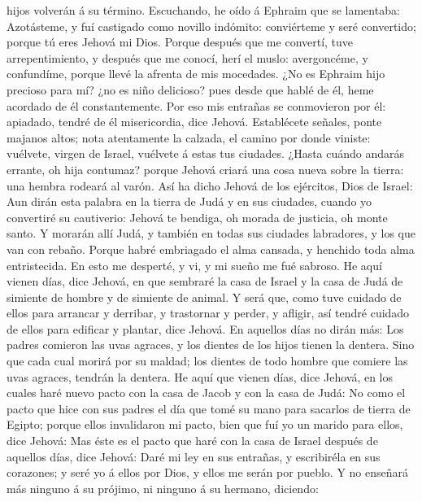 hijos volverán á su término.  Escuchando, he oído á Ephraim
que se lamentaba: Azotásteme, y fuí castigado como novillo indómito:
conviérteme y seré convertido; porque tú eres Jehová mi Dios.
 Porque después que me convertí, tuve arrepentimiento, y
después que me conocí, herí el muslo: avergoncéme, y confundíme, porque
llevé la afrenta de mis mocedades.  ¿No es Ephraim hijo
precioso para mí? ¿no es niño delicioso? pues desde que hablé de él,
heme acordado de él constantemente. Por eso mis entrañas se conmovieron
por él: apiadado, tendré de él misericordia, dice Jehová. 
Establécete señales, ponte majanos altos; nota atentamente la calzada,
el camino por donde viniste: vuélvete, virgen de Israel, vuélvete á
estas tus ciudades.  ¿Hasta cuándo andarás errante, oh hija
contumaz? porque Jehová criará una cosa nueva sobre la tierra: una
hembra rodeará al varón.  Así ha dicho Jehová de los
ejércitos, Dios de Israel: Aun dirán esta palabra en la tierra de Judá y
en sus ciudades, cuando yo convertiré su cautiverio: Jehová te bendiga,
oh morada de justicia, oh monte santo.  Y morarán allí
Judá, y también en todas sus ciudades labradores, y los que van con
rebaño.  Porque habré embriagado el alma cansada, y
henchido toda alma entristecida.  En esto me desperté, y
vi, y mi sueño me fué sabroso.  He aquí vienen días, dice
Jehová, en que sembraré la casa de Israel y la casa de Judá de simiente
de hombre y de simiente de animal.  Y será que, como tuve
cuidado de ellos para arrancar y derribar, y trastornar y perder, y
afligir, así tendré cuidado de ellos para edificar y plantar, dice
Jehová.  En aquellos días no dirán más: Los padres comieron
las uvas agraces, y los dientes de los hijos tienen la dentera.
 Sino que cada cual morirá por su maldad; los dientes de
todo hombre que comiere las uvas agraces, tendrán la dentera.
 He aquí que vienen días, dice Jehová, en los cuales haré
nuevo pacto con la casa de Jacob y con la casa de Judá:  No
como el pacto que hice con sus padres el día que tomé su mano para
sacarlos de tierra de Egipto; porque ellos invalidaron mi pacto, bien
que fuí yo un marido para ellos, dice Jehová:  Mas éste es
el pacto que haré con la casa de Israel después de aquellos días, dice
Jehová: Daré mi ley en sus entrañas, y escribiréla en sus corazones; y
seré yo á ellos por Dios, y ellos me serán por pueblo.  Y
no enseñará más ninguno á su prójimo, ni ninguno á su hermano, diciendo:
